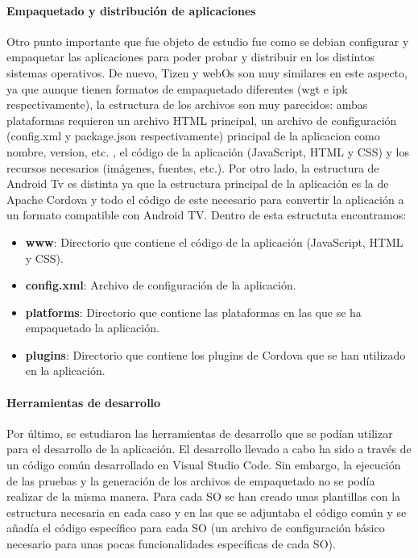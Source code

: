 \paragraph{Empaquetado y distribución de aplicaciones}
\label{par:analisis_estudio_sistemas_operativos_empaquetado}
Otro punto importante que fue objeto de estudio fue como se debian configurar y empaquetar las aplicaciones para
poder probar y distribuir en los distintos sistemas operativos. De nuevo, Tizen y webOs son muy similares en este
aspecto, ya que aunque tienen formatos de empaquetado diferentes (wgt e ipk respectivamente), la estructura de los
archivos son muy parecidos: ambas plataformas requieren un archivo HTML principal, un archivo de configuración  (config.xml y package.json respectivamente) principal 
de la aplicacion como nombre, version, etc. , el código de la aplicación (JavaScript, HTML y CSS) y los recursos necesarios
(imágenes, fuentes, etc.). Por otro lado, la estructura de Android Tv es distinta ya que la estructura principal de la aplicación
es la de Apache Cordova y todo el código de este necesario para convertir la aplicación a un formato compatible con Android TV.
Dentro de esta estructuta encontramos: 
\begin{itemize}
    \item \textbf{www}: Directorio que contiene el código de la aplicación (JavaScript, HTML y CSS).
    \item \textbf{config.xml}: Archivo de configuración de la aplicación.
    \item \textbf{platforms}: Directorio que contiene las plataformas en las que se ha empaquetado la aplicación.
    \item \textbf{plugins}: Directorio que contiene los plugins de Cordova que se han utilizado en la aplicación.
\end{itemize}

\paragraph{Herramientas de desarrollo}
\label{par:analisis_estudio_sistemas_operativos_herramientas_desarrollo}
Por último, se estudiaron las herramientas de desarrollo que se podían utilizar para el desarrollo de la aplicación.
El desarrollo llevado a cabo ha sido a través de un código común desarrollado en Visual Studio Code. Sin embargo,
la ejecución de las pruebas y la generación de los archivos de empaquetado no se podía realizar de la misma manera.
Para cada SO se han creado unas plantillas con la estructura necesaria en cada caso y en las que se adjuntaba el código común
y se añadía el código específico para cada SO (un archivo de configuración básico necesario para unas pocas funcionalidades específicas de cada SO).

